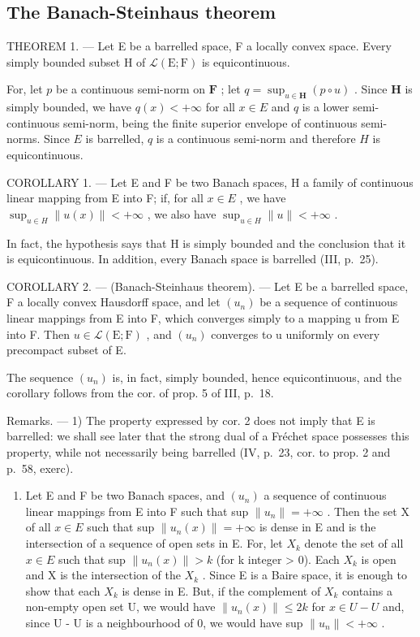 \subsection{The Banach-Steinhaus theorem}

THEOREM 1. --- Let E be a barrelled space, F a locally convex space. Every simply bounded subset H of \(\mathcal{L}(\mathrm{E};\mathrm{F})\) is equicontinuous.

For, let \(p\) be a continuous semi-norm on \(\mathbf{F}\) ; let \(q = \sup_{u\in \mathbf{H}}(p\circ u)\) . Since \(\mathbf{H}\) is simply bounded, we have \(q(x) < +\infty\) for all \(x \in E\) and \(q\) is a lower semi-continuous semi-norm, being the finite superior envelope of continuous semi-norms. Since \(E\) is barrelled, \(q\) is a continuous semi-norm and therefore \(H\) is equicontinuous.

COROLLARY 1. --- Let E and F be two Banach spaces, H a family of continuous linear mapping from E into F; if, for all \(x \in E\) , we have \(\sup_{u \in H} \|u(x)\| < +\infty\) , we also have \(\sup_{u \in H} \|u\| < +\infty\) .

In fact, the hypothesis says that H is simply bounded and the conclusion that it is equicontinuous. In addition, every Banach space is barrelled (III, p.~25).

COROLLARY 2. --- (Banach-Steinhaus theorem). --- Let E be a barrelled space, F a locally convex Hausdorff space, and let \((u_n)\) be a sequence of continuous linear mappings from E into F, which converges simply to a mapping u from E into F. Then \(u \in \mathcal{L}(\mathrm{E}; \mathrm{F})\) , and \((u_{n})\) converges to u uniformly on every precompact subset of E.

The sequence \((u_{n})\) is, in fact, simply bounded, hence equicontinuous, and the corollary follows from the cor. of prop. 5 of III, p.~18.

Remarks. --- 1) The property expressed by cor. 2 does not imply that E is barrelled: we shall see later that the strong dual of a Fréchet space possesses this property, while not necessarily being barrelled (IV, p.~23, cor. to prop. 2 and p.~58, exerc).

\begin{enumerate}
\def\labelenumi{\arabic{enumi})}
\setcounter{enumi}{1}
\tightlist
\item
  Let E and F be two Banach spaces, and \((u_{n})\) a sequence of continuous linear mappings from E into F such that sup \(\|u_{n}\| = +\infty\) . Then the set X of all \(x \in E\) such that sup \(\|u_{n}(x)\| = +\infty\) is dense in E and is the intersection of a sequence of open sets in E. For, let \(X_{k}\) denote the set of all \(x \in E\) such that sup \(\|u_{n}(x)\| > k\) (for k integer \textgreater{} 0). Each \(X_{k}\) is open and X is the intersection of the \(X_{k}\) . Since E is a Baire space, it is enough to show that each \(X_{k}\) is dense in E. But, if the complement of \(X_{k}\) contains a non-empty open set U, we would have \(\|u_{n}(x)\| \leqslant 2k\) for \(x \in U - U\) and, since U - U is a neighbourhood of 0, we would have sup \(\|u_{n}\| < +\infty\) .
\end{enumerate}

